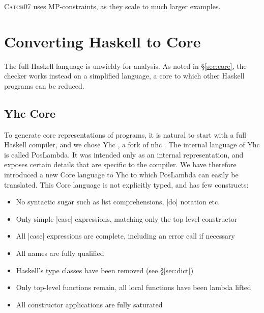 \documentclass[preprint]{sigplanconf}
\let\cite=\citep
\newcommand{\C}[1]{\textsf{#1}}
\newcommand{\catch}{\textsc{Catch}}
\newenvironment{discuss}
    {\noindent\hspace{-1.5mm}\vline\hspace{1mm}\vline\hspace{1mm}\begin{minipage}[h]{\linewidth}}
    {\end{minipage}}
\begin{document}
\begin{discuss}
\catch07 uses MP-constraints, as they scale to much larger examples.
\end{discuss}

\section{Converting Haskell to Core}
\label{sec:transform}

The full Haskell language is unwieldy for analysis. As noted in \S\ref{sec:core}, the checker works instead on a simplified language, a core to which other Haskell programs can be reduced.

\subsection{Yhc Core}

\begin{comment}
-- a simple variant of lambda calculus without types, but with source position information. Yhc works by applying basic desugaring transformations, without optimisation. This simplicity ensures the generated PosLambda is close to the original Haskell in its structure. Each top-level function in a source file maps to a top-level function in the generated PosLambda, retaining the same name.

However, PosLambda has constructs that have no direct representation in Haskell. For example, there is a FatBar construct \cite{spj:implementation}, used for compiling pattern matches which require fall through behaviour. The PosLambda language
\end{comment}

To generate core representations of programs, it is natural to start with a full Haskell compiler, and we chose Yhc \citep{Yhc}, a fork of nhc \citep{nhc}. The internal language of Yhc is called PosLambda. It was intended only as an internal representation, and exposes certain details that are specific to the compiler. We have therefore introduced a new Core language to Yhc to which PosLambda can easily be translated. This Core language is not explicitly typed, and has few constructs:

\begin{itemize}
\item No syntactic sugar such as list comprehensions, |do| notation etc.
\item Only simple |case| expressions, matching only the top level constructor
\item All |case| expressions are complete, including an \C{error} call if necessary
\item All names are fully qualified
\item Haskell's type classes have been removed (see \S\ref{sec:dict})
\item Only top-level functions remain, all local functions have been lambda lifted
\item All constructor applications are fully saturated
\end{itemize}
\end{document}
